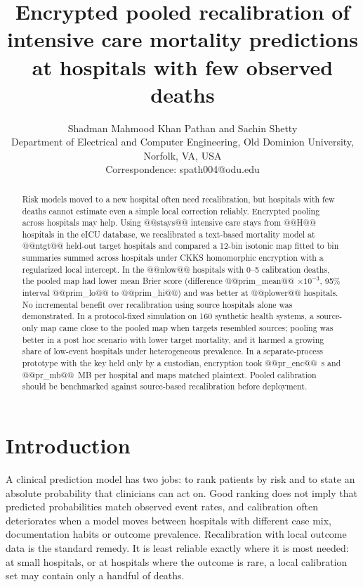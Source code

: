 \documentclass[11pt]{article}
\title{Encrypted pooled recalibration of intensive care mortality predictions at hospitals with few observed deaths}
\author{Shadman Mahmood Khan Pathan and Sachin Shetty\\
Department of Electrical and Computer Engineering, Old Dominion University, Norfolk, VA, USA\\
Correspondence: spath004@odu.edu}
\date{}
\begin{document}
\maketitle
\begin{abstract}
\noindent Risk models moved to a new hospital often need recalibration, but hospitals with few deaths cannot estimate even a simple local correction reliably. Encrypted pooling across hospitals may help. Using @@stays@@ intensive care stays from @@H@@ hospitals in the eICU database, we recalibrated a text-based mortality model at @@ntgt@@ held-out target hospitals and compared a 12-bin isotonic map fitted to bin summaries summed across hospitals under CKKS homomorphic encryption with a regularized local intercept. In the @@nlow@@ hospitals with 0--5 calibration deaths, the pooled map had lower mean Brier score (difference @@prim_mean@@ $\times10^{-3}$, 95\% interval @@prim_lo@@ to @@prim_hi@@) and was better at @@plower@@ hospitals. No incremental benefit over recalibration using source hospitals alone was demonstrated. In a protocol-fixed simulation on 160 synthetic health systems, a source-only map came close to the pooled map when targets resembled sources; pooling was better in a post hoc scenario with lower target mortality, and it harmed a growing share of low-event hospitals under heterogeneous prevalence. In a separate-process prototype with the key held only by a custodian, encryption took @@pr_enc@@~s and @@pr_mb@@~MB per hospital and maps matched plaintext. Pooled calibration should be benchmarked against source-based recalibration before deployment.
\end{abstract}

\section*{Introduction}
A clinical prediction model has two jobs: to rank patients by risk and to state an absolute probability that clinicians can act on. Good ranking does not imply that predicted probabilities match observed event rates, and calibration often deteriorates when a model moves between hospitals with different case mix, documentation habits or outcome prevalence\cite{r3}. Recalibration with local outcome data is the standard remedy\cite{r17}. It is least reliable exactly where it is most needed: at small hospitals, or at hospitals where the outcome is rare, a local calibration set may contain only a handful of deaths.
\end{document}

